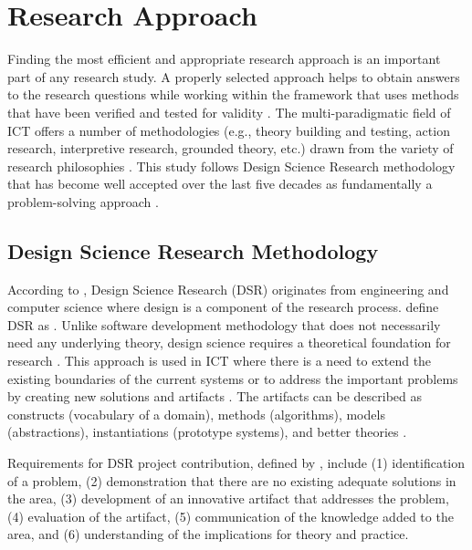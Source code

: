 \section{Research Approach}
\label{sec:method}

Finding the most efficient and appropriate research approach is an important
part of any research study. A properly selected approach helps to obtain answers
to the research questions while working within the framework that uses methods
that have been verified and tested for validity \citep{Kumar2005}.
The multi-paradigmatic field of ICT offers a number of methodologies (e.g.,
theory building and testing, action research, interpretive research, grounded
theory, etc.) drawn from the variety of research philosophies
\citep{Vaishnavi2007}. This study follows Design Science Research methodology
that has become well accepted over the last five decades as fundamentally a
problem-solving approach \citep{Cross1993}.

\subsection{Design Science Research Methodology}

According to \citet{Peffers2008}, Design Science Research (DSR) originates from
engineering and computer science where design is a component of the research
process. \citet[p.~4]{Iivari2009} define DSR as . Unlike software development methodology that
does not necessarily need any underlying theory, design science requires a
theoretical foundation for research \citep{Gero1999}. This approach is used in
ICT where there is a need to extend the existing boundaries of the current
systems or to address the important problems by creating new solutions and
artifacts \citep{Hevner2004}. The artifacts can be described as constructs
(vocabulary of a domain), methods (algorithms), models (abstractions),
instantiations (prototype systems), and better theories \citep{Hevner2010}. 

Requirements for DSR project contribution, defined by \citet{March2008}, include
(1) identification of a problem, (2) demonstration that there are no existing
adequate solutions in the area, (3) development of an innovative artifact that
addresses the problem, (4) evaluation of the artifact, (5) communication of the
knowledge added to the area, and (6) understanding of the implications for
theory and practice.

